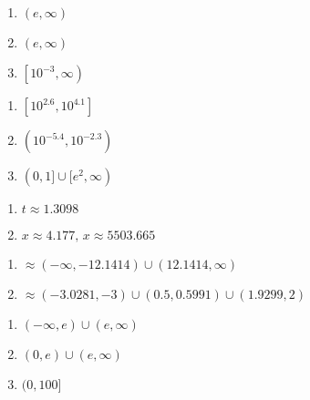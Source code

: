 \documentclass{ximera}
\begin{document}
\begin{enumerate}
\setcounter{enumi}{\value{HW}}

\item $(e, \infty)$
\item $(e, \infty)$
\item $\left[10^{-3}, \infty \right)$

\setcounter{HW}{\value{enumi}}
\end{enumerate}

\begin{enumerate}
\setcounter{enumi}{\value{HW}}

\item $\left[10^{2.6}, 10^{4.1}\right]$

\item $\left(10^{-5.4}, 10^{-2.3}\right)$
\item $(0, 1] \cup [e^{2}, \infty)$

\setcounter{HW}{\value{enumi}}
\end{enumerate}

\begin{enumerate}
\setcounter{enumi}{\value{HW}}

\item $t \approx 1.3098$
\item $x \approx 4.177, \, x \approx 5503.665$

\setcounter{HW}{\value{enumi}}
\end{enumerate}

\begin{enumerate}
\setcounter{enumi}{\value{HW}}

\item $\approx (-\infty, -12.1414) \cup (12.1414, \infty)$
\item $\approx (-3.0281, -3) \cup (0.5, 0.5991) \cup (1.9299, 2)$

\setcounter{HW}{\value{enumi}}
\end{enumerate}

\begin{enumerate}
\setcounter{enumi}{\value{HW}}

\item  $(-\infty, e) \cup (e, \infty)$

\item   $(0,e) \cup (e, \infty)$

\item  $(0, 100]$

\setcounter{HW}{\value{enumi}}
\end{enumerate}
\end{document}
